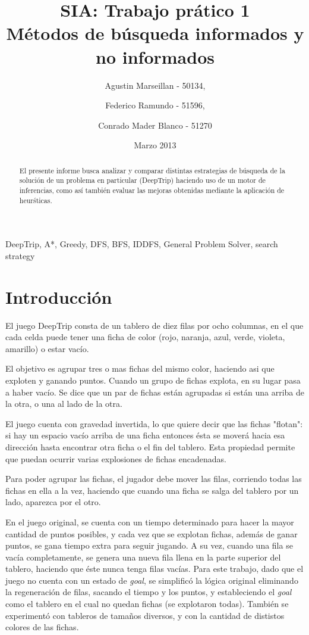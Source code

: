 \documentclass[%
    final,
    reprint,
    notitlepage,
    narroweqnarray,
    inline,
    twoside,
    invited
    ]{ieee}
\title{SIA: Trabajo pr\'atico 1\\ M\'etodos de b\'usqueda informados y no informados}
\author{Agustin Marseillan - 50134,
\and Federico Ramundo - 51596,
\and Conrado Mader Blanco - 51270}
\date{Marzo 2013}
\begin{document}

\maketitle
\begin{abstract}
El presente informe busca analizar y comparar distintas estrategias de b\'usqueda de la soluci\'on de un problema en particular (DeepTrip) haciendo uso de un motor de inferencias, como as\'i tambi\'en evaluar las mejoras obtenidas
mediante la aplicaci\'on de heur\'sticas.
\end{abstract}
\begin{keywords}
DeepTrip, A*, Greedy, DFS, BFS, IDDFS, General Problem Solver, search strategy
\end{keywords}
\section{Introducci\'on}
\PARstart El juego DeepTrip consta de un tablero de diez filas por ocho columnas, en el que cada celda puede tener una ficha de color (rojo, naranja, azul, verde, violeta, amarillo) o estar vac\'io. \\
\par El objetivo es agrupar tres o mas fichas del mismo color, haciendo asi que exploten y ganando puntos. Cuando un grupo de fichas explota, en su lugar pasa a haber vac\'io. Se dice que un par de fichas est\'an agrupadas si est\'an una arriba de la otra, o una al lado de la otra.\\
\par El juego cuenta con gravedad invertida, lo que quiere decir que las fichas "flotan": si hay un espacio vac\'io arriba de una ficha entonces \'esta se mover\'a hacia esa direcci\'on hasta encontrar otra ficha o el fin del tablero. 
Esta propiedad permite que puedan ocurrir varias explosiones de fichas encadenadas.\\
\par Para poder agrupar las fichas, el jugador debe mover las filas, corriendo todas las fichas en ella a la vez, haciendo que cuando una ficha se salga del tablero por un lado, aparezca por el otro.\\
\par En el juego original, se cuenta con un tiempo determinado para hacer la mayor cantidad de puntos posibles, y cada vez que se explotan fichas, adem\'as de ganar puntos, se gana tiempo extra para seguir jugando. A su vez, cuando una fila se vac\'ia completamente, se genera una nueva fila llena en la parte superior del tablero, haciendo que \'este nunca tenga filas vac\'ias. Para este trabajo, dado que el juego no cuenta con un estado de \textit{goal}, se simplific\'o la l\'ogica original eliminando la regeneraci\'on de filas, sacando el tiempo y los puntos, y estableciendo el \textit{goal} como el tablero en el cual no quedan fichas (se explotaron todas). Tambi\'en se experiment\'o con tableros de tama\~nos diversos, y con la cantidad de dististos colores de las fichas.
\end{document}
